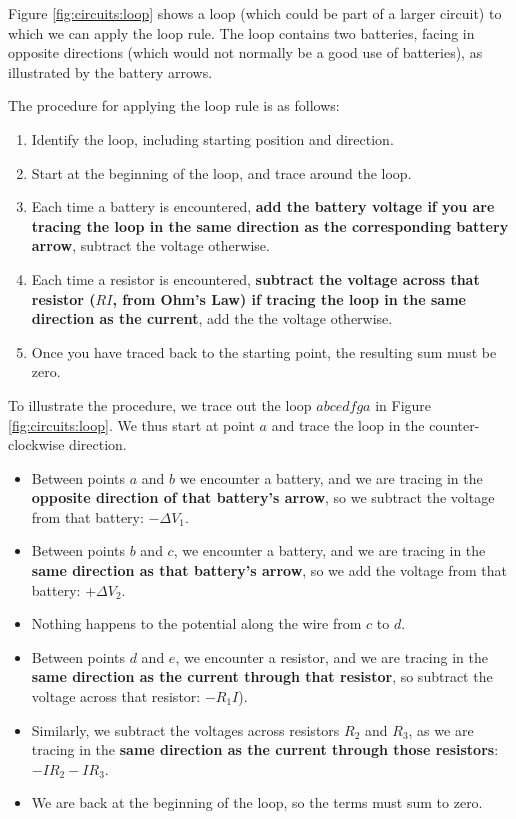 Figure \ref{fig:circuits:loop} shows a loop (which could be part of a larger circuit) to which we can apply the loop rule. The loop contains two batteries, facing in opposite directions (which would not normally be a good use of batteries), as illustrated by the battery arrows. 


The procedure for applying the loop rule is as follows:
\begin{enumerate}
\item Identify the loop, including starting position and direction.
\item Start at the beginning of the loop, and trace around the loop.
\item Each time a battery is encountered, \textbf{add the battery voltage if you are tracing the loop in the same direction as the corresponding battery arrow}, subtract the voltage otherwise.
\item Each time a resistor is encountered, \textbf{subtract the voltage across that resistor ($RI$, from Ohm's Law) if tracing the loop in the same direction as the current}, add the the voltage otherwise.
\item Once you have traced back to the starting point, the resulting sum must be zero.
\end{enumerate}
To illustrate the procedure, we trace out the loop $abcedfga$ in Figure \ref{fig:circuits:loop}. We thus start at point $a$ and trace the loop in the counter-clockwise direction. 
\begin{itemize}
\item Between points $a$ and $b$ we encounter a battery, and we are tracing in the \textbf{opposite direction of that battery's arrow}, so we subtract the voltage from that battery: $-\Delta V_1$.
\item Between points $b$ and $c$, we encounter a battery, and we are tracing in the \textbf{same direction as that battery's arrow}, so we add the voltage from that battery: $+\Delta V_2$.
\item Nothing happens to the potential along the wire from $c$ to $d$.
\item Between points $d$ and $e$, we encounter a resistor, and we are tracing in the \textbf{same direction as the current through that resistor}, so subtract the voltage across that resistor: $-R_1I$).
\item Similarly, we subtract the voltages across resistors $R_2$ and $R_3$, as we are tracing in the \textbf{same direction as the current through those resistors}: $-IR_2-IR_3$.
\item We are back at the beginning of the loop, so the terms must sum to zero.
\end{itemize}
